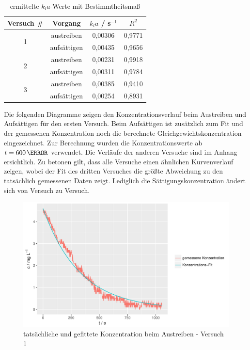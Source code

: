 \documentclass[12pt,liststotoc]{report}
\begin{document}
\begin{table}[H]
  \centering
  \caption{ermittelte $k_la$-Werte mit Bestimmtheitsmaß}
    \begin{tabular}{cccc}
    \toprule
    Versuch \# & Vorgang & $k_la$ / s$^{-1}$   & $R^2$ \\
    \midrule
    \multirow{2}[1]{*}{1} & austreiben & 0,00306 & 0,9771 \\
          & aufsättigen & 0,00435 & 0,9656 \\
          \midrule
             \multirow{2}[2]{*}{2} & austreiben & 0,00231 & 0,9918 \\
          & aufsättigen & 0,00311 & 0,9784 \\
          \midrule
    \multirow{2}[1]{*}{3} & austreiben & 0,00385 & 0,9410 \\
          & aufsättigen & 0,00254 & 0,8931 \\

    
          \bottomrule
    \end{tabular}%
  \label{tab:kla_R}%
\end{table}%

Die folgenden Diagramme zeigen den Konzentrationsverlauf beim Austreiben und Aufsättigen für den ersten Versuch. Beim Aufsättigen ist zusätzlich zum Fit und der gemessenen Konzentration noch die berechnete Gleichgewichtskonzentration eingezeichnet. Zur Berechnung wurden die Konzentrationswerte ab $t = 600\,\s$ verwendet. Die Verläufe der anderen Versuche sind im Anhang ersichtlich. Zu betonen gilt, dass alle Versuche einen ähnlichen Kurvenverlauf zeigen, wobei der Fit des dritten Versuches die größte Abweichung zu den tatsächlich gemessenen Daten zeigt. Lediglich die Sättigungskonzentration ändert sich von Versuch zu Versuch.

\begin{figure}[H]
\centering
\includegraphics[width=1\textwidth]{Graphics/austreiben_versuch-1.pdf} 
\caption[Austreiben Versuch 1]{tatsächliche und gefittete Konzentration beim Austreiben - Versuch 1}
\label{fig:c_aus_versuch1}
\end{figure}
\noindent
\end{document}
